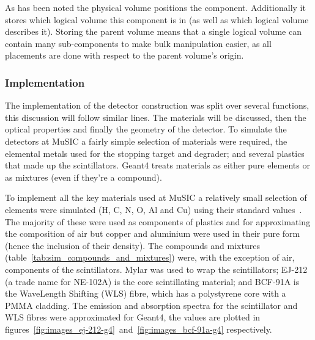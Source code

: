 As has been noted the physical volume positions the component. Additionally it stores which logical volume this component is in (as well as which logical volume describes it). Storing the parent volume means that a single logical volume can contain many sub-components to make bulk manipulation easier, as all placements are done with respect to the parent volume's origin.

\subsubsection{Implementation} %
\label{ssub:implementation}
The implementation of the detector construction was split over several functions, this discussion will follow similar lines. The materials will be discussed, then the optical properties and finally the geometry of the detector.
% 
To simulate the detectors at MuSIC a fairly simple selection of materials were required, the elemental metals used for the stopping target and degrader; and several plastics that made up the scintillators. Geant4 treats materials as either pure elements or as mixtures (even if they're a compound). 

To implement all the key materials used at MuSIC a relatively small selection of elements were simulated (H, C, N, O, Al and Cu) using their standard values~\cite{Some reference for elements}. The majority of these were used as components of plastics and for approximating the composition of air but copper and aluminium were used in their pure form (hence the inclusion of their density). The compounds and mixtures (table~\ref{tab:sim_compounds_and_mixtures}) were, with the exception of air, components of the scintillators. Mylar was used to wrap the scintillators; EJ-212 (a trade name for NE-102A) is the core scintillating material; and BCF-91A is the WaveLength Shifting (WLS) fibre, which has a polystyrene core with a PMMA cladding. The emission and absorption spectra for the scintillator and WLS fibres were approximated for Geant4, the values are plotted in  figures~\ref{fig:images_ej-212-g4}~and~\ref{fig:images_bcf-91a-g4} respectively.



